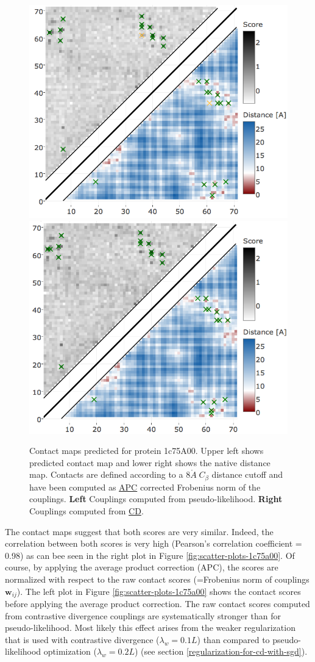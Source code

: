 \documentclass[11pt,a4paper,twoside]{book}
\newcommand{\Cb}{C_\beta}
\newcommand{\wij}{\mathbf{w}_{ij}}
\newcommand{\angstrom}{\mathring{A} \;}
\theoremstyle{definition}
\theoremstyle{definition}
\theoremstyle{remark}
\begin{document}
\begin{figure}

{\centering \includegraphics[width=0.49\linewidth]{img/full_likelihood/comparing_couplings/1c75A00/contact_map_pseudo-likelihood_apc_1c75A00} \includegraphics[width=0.49\linewidth]{img/full_likelihood/comparing_couplings/1c75A00/contact_map_contrastive_divergence_apc_1c75A00} 

}

\caption{Contact maps predicted for protein
1c75A00. Upper left shows predicted contact map and lower right shows
the native distance map. Contacts are defined according to a
\(8 \angstrom \Cb\) distance cutoff and have been computed as
\protect\hyperlink{abbrev}{APC} corrected Frobenius norm of the
couplings. \textbf{Left} Couplings computed from pseudo-likelihood.
\textbf{Right} Couplings computed from \protect\hyperlink{abbrev}{CD}.}\label{fig:contact-maps-1c75a00}
\end{figure}

The contact maps suggest that both scores are very similar. Indeed, the
correlation between both scores is very high (Pearson's correlation
coefficient = 0.98) as can bee seen in the right plot in Figure
\ref{fig:scatter-plots-1c75a00}. Of course, by applying the average
product correction (APC), the scores are normalized with respect to the
raw contact scores (=Frobenius norm of couplings \(\wij\)). The left
plot in Figure \ref{fig:scatter-plots-1c75a00} shows the contact scores
before applying the average product correction. The raw contact scores
computed from contrastive divergence couplings are systematically
stronger than for pseudo-likelihood. Most likely this effect arises from
the weaker regularization that is used with contrastive divergence
(\(\lambda_w = 0.1L\)) than compared to pseudo-likelihood optimization
(\(\lambda_w = 0.2L\)) (see section
\ref{regularization-for-cd-with-sgd}).
\end{document}
